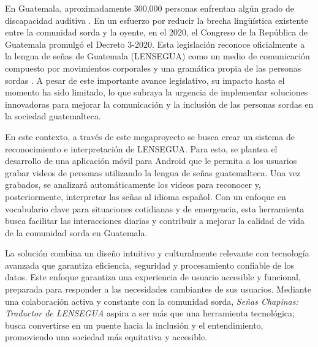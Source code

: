 En Guatemala, aproximadamente 300,000 personas enfrentan algún grado de discapacidad auditiva \cite{one}. En un esfuerzo por reducir la brecha lingüística existente entre la comunidad sorda y la oyente, en el 2020, el Congreso de la República de Guatemala promulgó el Decreto 3-2020. Esta legislación reconoce oficialmente a la lengua de señas de Guatemala (LENSEGUA) como un medio de comunicación compuesto por movimientos corporales y una gramática propia de las personas sordas \cite{two}. A pesar de este importante avance legislativo, su impacto hasta el momento ha sido limitado, lo que subraya la urgencia de implementar soluciones innovadoras para mejorar la comunicación y la inclusión de las personas sordas en la sociedad guatemalteca.

En este contexto, a través de este megaproyecto se busca crear un sistema de reconocimiento e interpretación de LENSEGUA. Para esto, se plantea el desarrollo de una aplicación móvil para Android que le permita a los usuarios grabar videos de personas utilizando la lengua de señas guatemalteca. Una vez grabados, se analizará automáticamente los videos para reconocer y, posteriormente, interpretar las señas al idioma español. Con un enfoque en vocabulario clave para situaciones cotidianas y de emergencia, esta herramienta busca facilitar las interacciones diarias y contribuir a mejorar la calidad de vida de la comunidad sorda en Guatemala.

La solución combina un diseño intuitivo y culturalmente relevante con tecnología avanzada que garantiza eficiencia, seguridad y procesamiento confiable de los datos. Este enfoque garantiza una experiencia de usuario accesible y funcional, preparada para responder a las necesidades cambiantes de sus usuarios. Mediante una colaboración activa y constante con la comunidad sorda, \textit{Señas Chapinas: Traductor de LENSEGUA} aspira a ser más que una herramienta tecnológica; busca convertirse en un puente hacia la inclusión y el entendimiento, promoviendo una sociedad más equitativa y accesible.